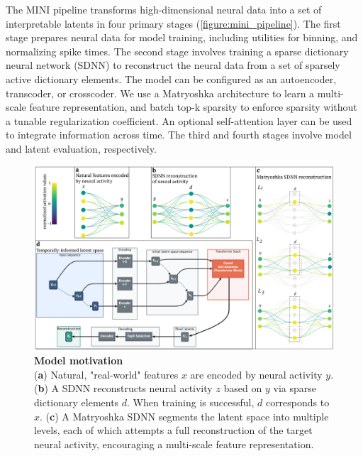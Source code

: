 \documentclass{article}
\begin{document}
The MINI pipeline transforms high-dimensional neural data into a set of interpretable latents in four primary stages (\autoref{figure:mini_pipeline}). The first stage prepares neural data for model training, including utilities for binning, and normalizing spike times. The second stage involves training a sparse dictionary neural network (SDNN) to reconstruct the neural data from a set of sparsely active dictionary elements. The model can be configured as an autoencoder, transcoder, or crosscoder. We use a Matryoshka architecture to learn a multi-scale feature representation, and batch top-k sparsity to enforce sparsity without a tunable regularization coefficient. An optional self-attention layer can be used to integrate information across time. The third and fourth stages involve model and latent evaluation, respectively.

\begin{figure}[htbp]
    \begin{minipage}{0.63\linewidth}
    \includegraphics[width=\linewidth]{figures/sdnn_arch.pdf}
    \end{minipage}%
    \begin{minipage}{0.37\linewidth}
    \caption{
        \textbf{Model motivation} \\
        \small
        (\textbf{a}) Natural, "real-world" features $x$ are encoded by neural activity $y$. (\textbf{b}) A SDNN reconstructs neural activity $z$ based on $y$ via sparse dictionary elements $d$. When training is successful, $d$ corresponds to $x$. (\textbf{c}) A Matryoshka SDNN segments the latent space into multiple levels, each of which attempts a full reconstruction of the target neural activity, encouraging a multi-scale feature representation.
    }
    \label{figure:sdnn_arch}
    \end{minipage}
\end{figure}



\end{document}
